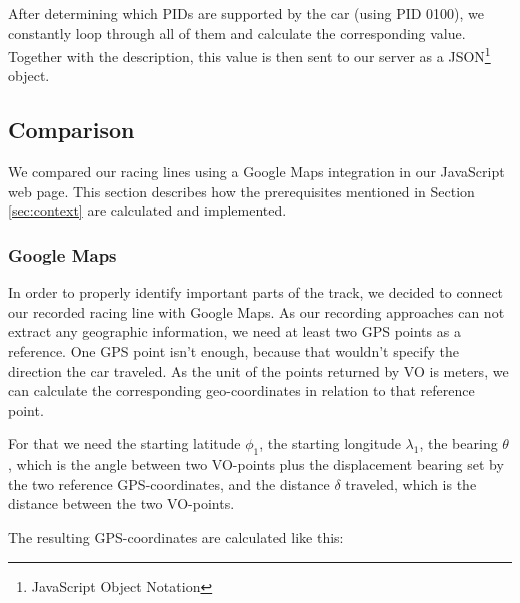 After determining which PIDs are supported by the car (using PID 0100), we constantly loop through all of them and calculate the corresponding value. Together with the description, this value is then sent to our server as a JSON\footnote{JavaScript Object Notation} object.

\subsection{Comparison}
We compared our racing lines using a Google Maps integration in our JavaScript web page. This section describes how the prerequisites mentioned in Section \ref{sec:context} are calculated and implemented.

\subsubsection{Google Maps}
In order to properly identify important parts of the track, we decided to connect our recorded racing line with Google Maps.
\clearpage
As our recording approaches can not extract any geographic information, we need at least two GPS points as a reference. One GPS point isn't enough, because that wouldn't specify the direction the car traveled. As the unit of the points returned by VO is meters, we can calculate the corresponding geo-coordinates in relation to that reference point. 

For that we need the starting latitude $\phi_1$, the starting longitude $\lambda_1$, the bearing $\theta$, which is the angle between two VO-points plus the displacement bearing set by the two reference GPS-coordinates, and the distance $\delta$ traveled, which is the distance between the two VO-points.

The resulting GPS-coordinates are calculated like this:

